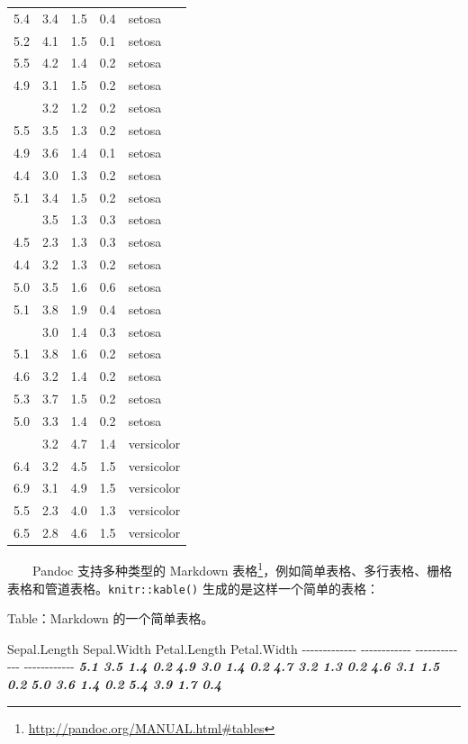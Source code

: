 \documentclass[
  12pt,
]{krantz}
\newenvironment{Shaded}{\begin{snugshade}}{\end{snugshade}}
\newcommand{\InformationTok}[1]{\textcolor[rgb]{0.56,0.35,0.01}{\textbf{\textit{#1}}}}
\newcommand{\NormalTok}[1]{#1}
\renewcommand{\href}[2]{#2\footnote{\url{#1}}}
\theoremstyle{definition}
\theoremstyle{definition}
\theoremstyle{definition}
\theoremstyle{definition}
\theoremstyle{remark}
\begin{document}
\begin{longtable}[t]{rrrrl}
5.4 & 3.4 & 1.5 & 0.4 & setosa\\
5.2 & 4.1 & 1.5 & 0.1 & setosa\\
5.5 & 4.2 & 1.4 & 0.2 & setosa\\
4.9 & 3.1 & 1.5 & 0.2 & setosa\\
\addlinespace
5.0 & 3.2 & 1.2 & 0.2 & setosa\\
5.5 & 3.5 & 1.3 & 0.2 & setosa\\
4.9 & 3.6 & 1.4 & 0.1 & setosa\\
4.4 & 3.0 & 1.3 & 0.2 & setosa\\
5.1 & 3.4 & 1.5 & 0.2 & setosa\\
\addlinespace
5.0 & 3.5 & 1.3 & 0.3 & setosa\\
4.5 & 2.3 & 1.3 & 0.3 & setosa\\
4.4 & 3.2 & 1.3 & 0.2 & setosa\\
5.0 & 3.5 & 1.6 & 0.6 & setosa\\
5.1 & 3.8 & 1.9 & 0.4 & setosa\\
\addlinespace
4.8 & 3.0 & 1.4 & 0.3 & setosa\\
5.1 & 3.8 & 1.6 & 0.2 & setosa\\
4.6 & 3.2 & 1.4 & 0.2 & setosa\\
5.3 & 3.7 & 1.5 & 0.2 & setosa\\
5.0 & 3.3 & 1.4 & 0.2 & setosa\\
\addlinespace
7.0 & 3.2 & 4.7 & 1.4 & versicolor\\
6.4 & 3.2 & 4.5 & 1.5 & versicolor\\
6.9 & 3.1 & 4.9 & 1.5 & versicolor\\
5.5 & 2.3 & 4.0 & 1.3 & versicolor\\
6.5 & 2.8 & 4.6 & 1.5 & versicolor\\
\bottomrule
\end{longtable}

  Pandoc 支持多种类型的 \href{http://pandoc.org/MANUAL.html\#tables}{Markdown 表格}，例如简单表格、多行表格、栅格表格和管道表格。\texttt{knitr::kable()} 生成的是这样一个简单的表格：

\begin{Shaded}
\begin{Highlighting}[]
\NormalTok{Table：Markdown 的一个简单表格。}

\NormalTok{ Sepal.Length   Sepal.Width   Petal.Length   Petal.Width}
\NormalTok{{-}{-}{-}{-}{-}{-}{-}{-}{-}{-}{-}{-}{-}  {-}{-}{-}{-}{-}{-}{-}{-}{-}{-}{-}{-}  {-}{-}{-}{-}{-}{-}{-}{-}{-}{-}{-}{-}{-}  {-}{-}{-}{-}{-}{-}{-}{-}{-}{-}{-}{-}}
\InformationTok{          5.1           3.5            1.4           0.2}
\InformationTok{          4.9           3.0            1.4           0.2}
\InformationTok{          4.7           3.2            1.3           0.2}
\InformationTok{          4.6           3.1            1.5           0.2}
\InformationTok{          5.0           3.6            1.4           0.2}
\InformationTok{          5.4           3.9            1.7           0.4}
\end{Highlighting}
\end{Shaded}
\end{document}
